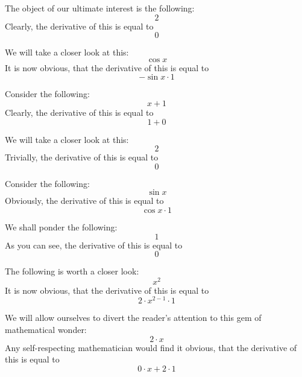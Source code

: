\documentclass{article}
\begin{document}
The object of our ultimate interest is the following:
\begin{equation}
2 
\end{equation}
Clearly, the derivative of this is equal to
\begin{equation}
0 
\end{equation}

We will take a closer look at this:
\begin{equation}
\cos x 
\end{equation}
It is now obvious, that the derivative of this is equal to
\begin{equation}
-\sin x \cdot 1 
\end{equation}

Consider the following:
\begin{equation}
x + 1 
\end{equation}
Clearly, the derivative of this is equal to
\begin{equation}
1 + 0 
\end{equation}

We will take a closer look at this:
\begin{equation}
2 
\end{equation}
Trivially, the derivative of this is equal to
\begin{equation}
0 
\end{equation}

Consider the following:
\begin{equation}
\sin x 
\end{equation}
Obviously, the derivative of this is equal to
\begin{equation}
\cos x \cdot 1 
\end{equation}

We shall ponder the following:
\begin{equation}
1 
\end{equation}
As you can see, the derivative of this is equal to
\begin{equation}
0 
\end{equation}

The following is worth a closer look:
\begin{equation}
x ^{2 } 
\end{equation}
It is now obvious, that the derivative of this is equal to
\begin{equation}
2 \cdot x ^{2 - 1 } \cdot 1 
\end{equation}

We will allow ourselves to divert the reader's attention to this gem of mathematical wonder:
\begin{equation}
2 \cdot x 
\end{equation}
Any self-respecting mathematician would find it obvious, that the derivative of this is equal to
\begin{equation}
0 \cdot x + 2 \cdot 1 
\end{equation}
\end{document}
